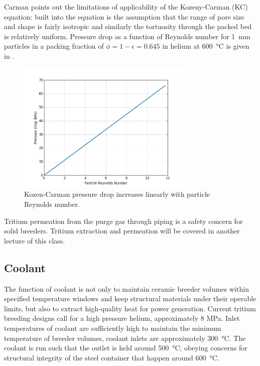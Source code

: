 \documentclass[11pt]{report} %
\begin{document}
Carman points out the limitations of applicability of the Kozeny-Carman (KC) equation: built into the equation is the assumption that the range of pore size and shape is fairly isotropic and similarly the tortuosity through the packed bed is relatively uniform. Pressure drop as a function of Reynolds number for \SI{1}{\milli\meter} particles in a packing fraction of $\phi = 1-\epsilon = 0.645$ in helium at \SI{600}{\celsius} is given in .

\begin{figure}[ht]
    \centering
    \includegraphics[width=0.75\textwidth]{images/KC-pressure-drop}
    \caption{Kozen-Carman pressure drop increases linearly with particle Reynolds number.}
    \label{fig:KC-pressure-drop}
\end{figure}

Tritium permeation from the purge gas through piping is a safety concern for solid breeders. Tritium extraction and permeation will be covered in another lecture of this class.

\subsection{Coolant}
The function of coolant is not only to maintain ceramic breeder volumes within specified temperature windows and keep structural materials under their operable limits, but also to extract high-quality heat for power generation. Current tritium breeding designs call for a high pressure helium, approximately 8 MPa. Inlet temperatures of coolant are sufficiently high to maintain the minimum temperature of breeder volumes, coolant inlets are approximately \SI{300}{\celsius}. The coolant is run such that the outlet is held around \SI{500}{\celsius}; obeying concerns for structural integrity of the steel container that happen around \SI{600}{\celsius}.
\end{document}
